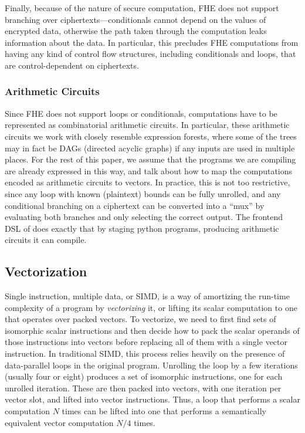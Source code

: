 Finally, because of the nature of secure computation, FHE does not support branching over ciphertexts---conditionals cannot depend on the values of encrypted data, otherwise the path taken through the computation leaks information about the data. 
In particular, this precludes FHE computations from having any kind of control flow structures, including conditionals and loops, that are control-dependent on ciphertexts.

\subsubsection{Arithmetic Circuits}%
Since FHE does not support loops or conditionals, computations have to be represented as combinatorial arithmetic circuits.
In particular, these arithmetic circuits we work with closely resemble expression forests, where some of the trees may in fact be DAGs (directed acyclic graphs) if any inputs are used in multiple places.
For the rest of this paper, we assume that the programs we are compiling are already expressed in this way, and talk about how to map the computations encoded as arithmetic circuits to vectors.
In practice, this is not too restrictive, since any loop with known (plaintext) bounds can be fully unrolled, and any conditional branching on a ciphertext can be converted into a ``mux'' by evaluating both branches and only selecting the correct output.
The frontend DSL of \system does exactly that by staging python programs, producing arithmetic circuits it can compile.

\subsection{Vectorization}
Single instruction, multiple data, or SIMD, is a way of amortizing the run-time complexity of a program by {\em vectorizing} it, or lifting its scalar computation to one that operates over packed vectors.
To vectorize, we need to first find sets of isomorphic scalar instructions and then decide how to pack the scalar operands of those instructions into vectors before replacing all of them with a single vector instruction.
In traditional SIMD, this process relies heavily on the presence of data-parallel loops in the original program.
Unrolling the loop by a few iterations (usually four or eight) produces a set of isomorphic instructions, one for each unrolled iteration.
These are then packed into vectors, with one iteration per vector slot, and lifted into vector instructions.
Thus, a loop that performs a scalar computation $N$ times can be lifted into one that performs a semantically equivalent vector computation $N/4$ times.


